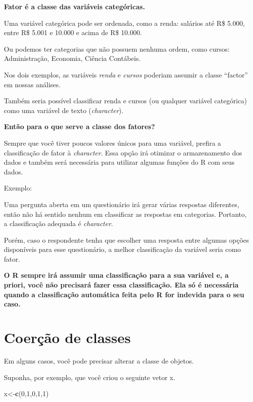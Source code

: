 \documentclass[
]{book}
\newenvironment{Shaded}{\begin{snugshade}}{\end{snugshade}}
\newcommand{\DecValTok}[1]{\textcolor[rgb]{0.00,0.00,0.81}{#1}}
\newcommand{\KeywordTok}[1]{\textcolor[rgb]{0.13,0.29,0.53}{\textbf{#1}}}
\newcommand{\NormalTok}[1]{#1}
\begin{document}
\textbf{Fator é a classe das variáveis categóricas.}

Uma variável categórica pode ser ordenada, como a renda: salários até
R\$ 5.000, entre R\$ 5.001 e 10.000 e acima de R\$ 10.000.

Ou podemos ter categorias que não possuem nenhuma ordem, como cursos:
Administração, Economia, Ciência Contábeis.

Nos dois exemplos, as variáveis \emph{renda} e \emph{cursos} poderiam
assumir a classe ``factor'' em nossas análises.

Também seria possível classificar renda e cursos (ou qualquer variável
categórica) como uma variável de texto (\emph{character}).

\textbf{Então para o que serve a classe dos fatores?}

Sempre que você tiver poucos valores únicos para uma variável, prefira a
classificação de fator à \emph{character}. Essa opção irá otimizar o
armazenamento dos dados e também será necessária para utilizar algumas
funções do R com seus dados.

Exemplo:

Uma pergunta aberta em um questionário irá gerar várias respostas
diferentes, então não há sentido nenhum em classificar as respostas em
categorias. Portanto, a classificação adequada é \emph{character}.

Porém, caso o respondente tenha que escolher uma resposta entre algumas
opções disponíveis para esse questionário, a melhor classificação da
variável seria como fator.

\textbf{O R sempre irá assumir uma classificação para a sua variável e,
a priori, você não precisará fazer essa classificação. Ela só é
necessária quando a classificação automática feita pelo R for indevida
para o seu caso.}

\hypertarget{coeruxe7uxe3o-de-classes}{%
\section{Coerção de classes}\label{coeruxe7uxe3o-de-classes}}

Em alguns casos, você pode precisar alterar a classe de objetos.

Suponha, por exemplo, que você criou o seguinte vetor x.

\begin{Shaded}
\begin{Highlighting}[]
\NormalTok{x<-}\KeywordTok{c}\NormalTok{(}\DecValTok{0}\NormalTok{,}\DecValTok{1}\NormalTok{,}\DecValTok{0}\NormalTok{,}\DecValTok{1}\NormalTok{,}\DecValTok{1}\NormalTok{)}
\end{Highlighting}
\end{Shaded}
\end{document}
